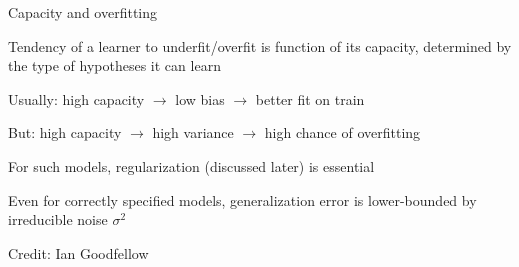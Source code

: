 \documentclass[11pt,compress,t,notes=noshow, xcolor=table]{beamer}
\begin{document}
\begin{framei}[sep=M]{Capacity and overfitting}

\item Tendency of a learner to underfit/overfit is function of its capacity, determined by the type of hypotheses it can learn
\item Usually: high capacity $\rightarrow$ low bias $\rightarrow$ better fit on train
\item But: high capacity $\rightarrow$ high variance $\rightarrow$ high chance of overfitting
\item For such models, regularization (discussed later) is essential
\item Even for correctly specified models, generalization error is lower-bounded by irreducible noise $\sigma^2$

\tiny \centering
Credit: Ian Goodfellow

\end{framei}

\endlecture
\end{document}
